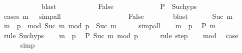 \begin{isabellebody}
\ \ \ \ \ \ \ \ \ \ \isamarkupfalse%
\ blast\isanewline
\ \ \ \ \ \ \ \ \isamarkupfalse%
\ \isamarkupfalse%
\ False\isanewline
\ \ \ \ \ \ \ \ \ \ \isamarkupfalse%
\ {\isacartoucheopen}{\isasymnot}\ P\ {}{\isacartoucheclose}\ Suc{\isachardot}{\kern0pt}hyps\ \isamarkupfalse%
\ {\isacharparenleft}{\kern0pt}cases\ {\isachardoublequoteopen}m\ {\isacharequal}{\kern0pt}\ {}{\isachardoublequoteclose}{\isacharparenright}{\kern0pt}\ simp{\isacharunderscore}{\kern0pt}all\isanewline
\ \ \ \ \ \ \isamarkupfalse%
\isanewline
\ \ \ \ \isamarkupfalse%
\isanewline
\ \ \ \ \isamarkupfalse%
\ \isamarkupfalse%
\ False\isanewline
\ \ \ \ \ \ \isamarkupfalse%
\ blast\isanewline
\ \ \isamarkupfalse%
\isanewline
{}\isamarkupfalse%
\isanewline
\ \ \isamarkupfalse%
\ {\isacharparenleft}{\kern0pt}Suc\ m{\isacharparenright}{\kern0pt}\isanewline
\ \ \isamarkupfalse%
\ \isamarkupfalse%
\ {\isachardoublequoteopen}m\ {\isacharless}{\kern0pt}\ p{\isachardoublequoteclose}\ \ mod{\isacharcolon}{\kern0pt}\ {\isachardoublequoteopen}Suc\ m\ mod\ p\ {\isacharequal}{\kern0pt}\ Suc\ m{\isachardoublequoteclose}\isanewline
\ \ \ \ \isamarkupfalse%
\ simp{\isacharunderscore}{\kern0pt}all\isanewline
\ \ \isamarkupfalse%
\ {\isacartoucheopen}m\ {\isacharless}{\kern0pt}\ p{\isacartoucheclose}\ \isamarkupfalse%
\ {\isachardoublequoteopen}P\ m{\isachardoublequoteclose}\isanewline
\ \ \ \ \isamarkupfalse%
\ {\isacharparenleft}{\kern0pt}rule\ Suc{\isachardot}{\kern0pt}hyps{\isacharparenright}{\kern0pt}\isanewline
\ \ \isamarkupfalse%
\ {\isacartoucheopen}m\ {\isacharless}{\kern0pt}\ p{\isacartoucheclose}\ \isamarkupfalse%
\ {\isachardoublequoteopen}P\ {\isacharparenleft}{\kern0pt}Suc\ m\ mod\ p{\isacharparenright}{\kern0pt}{\isachardoublequoteclose}\isanewline
\ \ \ \ \isamarkupfalse%
\ {\isacharparenleft}{\kern0pt}rule\ step{\isacharparenright}{\kern0pt}\isanewline
\ \ \isamarkupfalse%
\ mod\ \isamarkupfalse%
\ {\isacharquery}{\kern0pt}case\isanewline
\ \ \ \ \isamarkupfalse%
\ simp\isanewline
{}\isamarkupfalse%
%
\endisatagproof
{\isafoldproof}%
%
\isadelimproof
\isanewline
%
\endisadelimproof
\isanewline
{}\isamarkupfalse%

\end{isabellebody}
